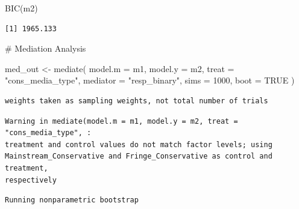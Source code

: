 \documentclass[
  letterpaper,
  DIV=11,
  numbers=noendperiod]{scrartcl}
\newenvironment{Shaded}{\begin{snugshade}}{\end{snugshade}}
\newcommand{\AttributeTok}[1]{\textcolor[rgb]{0.40,0.45,0.13}{#1}}
\newcommand{\CommentTok}[1]{\textcolor[rgb]{0.37,0.37,0.37}{#1}}
\newcommand{\ConstantTok}[1]{\textcolor[rgb]{0.56,0.35,0.01}{#1}}
\newcommand{\DecValTok}[1]{\textcolor[rgb]{0.68,0.00,0.00}{#1}}
\newcommand{\FunctionTok}[1]{\textcolor[rgb]{0.28,0.35,0.67}{#1}}
\newcommand{\NormalTok}[1]{\textcolor[rgb]{0.00,0.23,0.31}{#1}}
\newcommand{\OtherTok}[1]{\textcolor[rgb]{0.00,0.23,0.31}{#1}}
\newcommand{\StringTok}[1]{\textcolor[rgb]{0.13,0.47,0.30}{#1}}
\begin{document}
\begin{Shaded}
\begin{Highlighting}[]
\FunctionTok{BIC}\NormalTok{(m2)}
\end{Highlighting}
\end{Shaded}

\begin{verbatim}
[1] 1965.133
\end{verbatim}

\begin{Shaded}
\begin{Highlighting}[]
\CommentTok{\# Mediation Analysis}

\NormalTok{med\_out }\OtherTok{\textless{}{-}} \FunctionTok{mediate}\NormalTok{(}
  \AttributeTok{model.m =}\NormalTok{ m1,}
  \AttributeTok{model.y =}\NormalTok{ m2,}
  \AttributeTok{treat   =} \StringTok{"cons\_media\_type"}\NormalTok{,}
  \AttributeTok{mediator =} \StringTok{"resp\_binary"}\NormalTok{,}
  \AttributeTok{sims =} \DecValTok{1000}\NormalTok{,         }
  \AttributeTok{boot =} \ConstantTok{TRUE}
\NormalTok{)}
\end{Highlighting}
\end{Shaded}

\begin{verbatim}
weights taken as sampling weights, not total number of trials
\end{verbatim}

\begin{verbatim}
Warning in mediate(model.m = m1, model.y = m2, treat = "cons_media_type", :
treatment and control values do not match factor levels; using
Mainstream_Conservative and Fringe_Conservative as control and treatment,
respectively
\end{verbatim}

\begin{verbatim}
Running nonparametric bootstrap
\end{verbatim}
\end{document}
